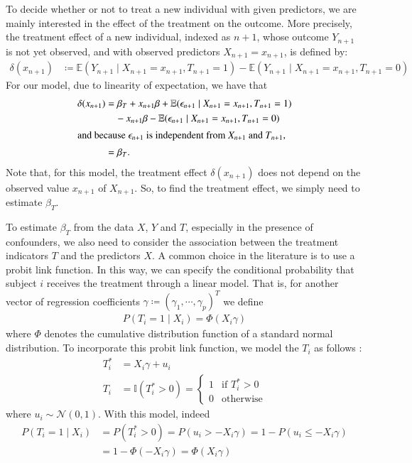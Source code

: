 \documentclass[preprint,12pt]{elsarticle}
\begin{document}
To decide whether or not to treat a new individual with given predictors,
we are mainly interested in the effect of the treatment on the outcome.
More precisely, the treatment effect of a new individual, indexed as $n+1$,
whose outcome $Y_{n+1}$ is not yet observed, and with observed predictors $X_{n+1}=x_{n+1}$, is defined by:
\begin{align}
  \delta(x_{n+1})
  &\coloneqq\mathbb{E}(Y_{n+1}\mid X_{n+1}=x_{n+1},T_{n+1} =1) - \mathbb{E}(Y_{n+1}\mid X_{n+1}=x_{n+1},T_{n+1}=0)
\end{align}
For our model, due to linearity of expectation, we have that
\begin{align}
  \delta(x_{n+1})
  &=\beta_T+x_{n+1}\beta+\mathbb{E}(\epsilon_{n+1}\mid X_{n+1}=x_{n+1},T_{n+1} =1) \\
  &\quad - x_{n+1}\beta-\mathbb{E}(\epsilon_{n+1}\mid X_{n+1}=x_{n+1},T_{n+1} =0)\\
  \intertext{and because $\epsilon_{n+1}$ is independent from $X_{n+1}$ and $T_{n+1}$,}
  &=\beta_{T}.
\end{align}
Note that, for this model, the treatment effect $\delta(x_{n+1})$
does not depend on the observed value $x_{n+1}$ of $X_{n+1}$.
So, to find the treatment effect, we simply need to estimate $\beta_T$.

To estimate $\beta_T$ from the data $X$, $Y$ and $T$,
especially in the presence of confounders,
we also need to consider the
association between the treatment indicators $T$ and the predictors $X$.
A common choice in the literature is to use a probit link function.
In this way, we can
specify the conditional probability that subject $i$ receives the treatment through a linear model. 
That is, for another vector of regression coefficients 
$\gamma\coloneqq(\gamma_1, \cdots, \gamma_p)^T$ we define
\begin{align}
	P(T_i=1\mid X_i) = \Phi(X_i\gamma)
\end{align}
where $\Phi$ denotes the cumulative distribution function
of a standard normal distribution. To incorporate this probit
link function, we model the $T_i$ as follows \cite{albert93}:
\begin{align}
    T_i^* &= X_i\gamma +u_i \\
    T_i   &= \mathbb{I}(T_i^*>0)
    =
    \begin{cases}
    1 & \text{if }T_i^*>0 \\
    0 & \text{otherwise}
    \end{cases}
\end{align}
where $u_i\sim\mathcal{N}(0,1)$.
With this model, indeed
\begin{align}
  P(T_i=1\mid X_i)
  &=P(T_i^*>0)=P(u_i>-X_i\gamma)=1-P(u_i\le -X_i\gamma) \\
  &=1-\Phi(-X_i\gamma)=\Phi(X_i\gamma)
\end{align}
\end{document}
